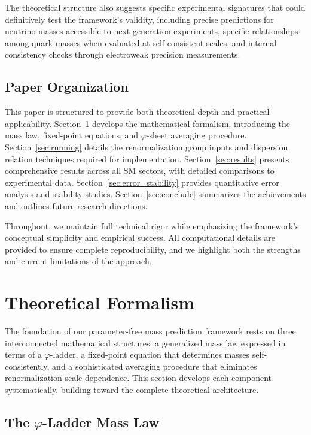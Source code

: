 \documentclass[%
amsmath,amssymb,
aps,
prb,
floatfix,
twocolumn
]{revtex4-2}
\begin{document}
The theoretical structure also suggests specific experimental signatures that could definitively test the framework's validity, including precise predictions for neutrino masses accessible to next-generation experiments, specific relationships among quark masses when evaluated at self-consistent scales, and internal consistency checks through electroweak precision measurements.

\subsection{Paper Organization}

This paper is structured to provide both theoretical depth and practical applicability. Section~\ref{sec:formalism} develops the mathematical formalism, introducing the mass law, fixed-point equations, and $\varphi$-sheet averaging procedure. Section~\ref{sec:running} details the renormalization group inputs and dispersion relation techniques required for implementation. Section~\ref{sec:results} presents comprehensive results across all SM sectors, with detailed comparisons to experimental data. Section~\ref{sec:error_stability} provides quantitative error analysis and stability studies. Section~\ref{sec:conclude} summarizes the achievements and outlines future research directions.

Throughout, we maintain full technical rigor while emphasizing the framework's conceptual simplicity and empirical success. All computational details are provided to ensure complete reproducibility, and we highlight both the strengths and current limitations of the approach.

\section{Theoretical Formalism}
\label{sec:formalism}

The foundation of our parameter-free mass prediction framework rests on three interconnected mathematical structures: a generalized mass law expressed in terms of a $\varphi$-ladder, a fixed-point equation that determines masses self-consistently, and a sophisticated averaging procedure that eliminates renormalization scale dependence. This section develops each component systematically, building toward the complete theoretical architecture.

\subsection{The $\varphi$-Ladder Mass Law}
\label{subsec:mass-law}
\end{document}
